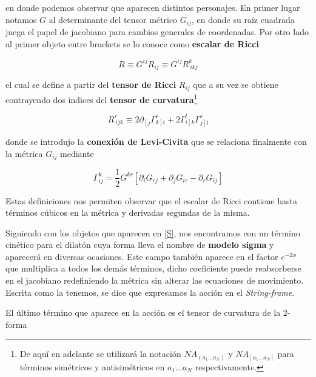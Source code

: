 \documentclass{article}
\numberwithin{equation}{section}
\begin{document}
\vspace{.4cm}

en donde podemos observar que aparecen distintos personajes. En primer lugar notamos $ G $ al determinante del tensor métrico $ G_{i j} $, en donde su raíz cuadrada juega el papel de jacobiano para cambios generales de coordenadas. Por otro lado al primer objeto entre brackets se lo conoce como \textbf{escalar de Ricci} 

\begin{equation}\label{R}
R \equiv G^{ i j}R_{i j} \equiv G^{i j}R^k_{ \ i k j}
\end{equation}

el cual se define a partir del \textbf{tensor de Ricci} $ R_{i j} $ que a su vez se obtiene contrayendo dos indices del \textbf{tensor de curvatura}\footnote{De aquí en adelante se utilizará la notación $ N A_{\left(a_1... a_N \right)} $ y $ N A_{\left[a_1...a_N \right]} $ para términos simétricos y antisimétricos en $ a_1...a_N $ respectivamente.}

\begin{equation}\label{riccitensor}
 R^r_{ \ i j k} \equiv 2 \partial_{\left[ j \right.} \Gamma^r_{\left. k \right] i} +   2\Gamma^l_{i \left[ k \right.}\Gamma^r_{ \left. j \right] l}
\end{equation} 

donde se introdujo la \textbf{conexión de Levi-Civita} que se relaciona finalmente con la métrica $ G_{i j} $ mediante

\begin{equation*}
\Gamma^{k}_{i j} = \frac{1}{2}G^{k r}\left[ \partial_i G_{r j} + \partial_j G_{i r} - \partial_r G_{i j}\right]
\end{equation*}

Estas definiciones nos permiten observar que el escalar de Ricci contiene hasta términos cúbicos en la métrica y derivadas segundas de la misma.

Siguiendo con los objetos que aparecen en \ref{S}, nos encontramos con un término cinético para el dilatón cuya forma lleva el nombre de \textbf{modelo sigma} y aparecerá en diversas ocasiones. Este campo también aparece en el factor $e^{-2\phi} $ que multiplica a todos los demás términos, dicho coeficiente puede reabsorberse en el jacobiano redefiniendo la métrica sin alterar las ecuaciones de movimiento. Escrita como la tenemos, se dice que expresamos la acción en el \textit{String-frame}.

El último término que aparece en la acción es el tensor de curvatura de la 2-forma
\end{document}
